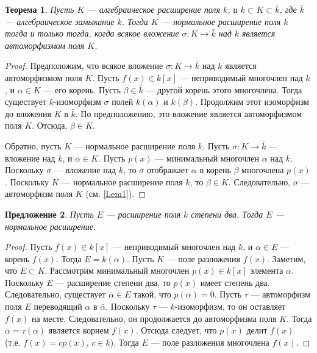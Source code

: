 \documentclass[12pt, titlepage, oneside]{amsbook}
\newtheorem{theorem}{Теорема}[chapter]
\newtheorem{proposition}[theorem]{Предложение}
\theoremstyle{definition}
\theoremstyle{remark}
\begin{document}
\begin{theorem}
\label{Nor6}
Пусть $K$ --- алгебраическое расширение поля $k$, и $k\subset K\subset\bar{k}$, где $\bar{k}$ --- алгебраическое замыкание $k$. Тогда $K$ --- нормальное расширение поля $k$ тогда и только тогда, когда всякое вложение $\sigma\colon K\rightarrow\bar{k}$ над $k$ является автоморфизмом поля $K$.
\end{theorem}

\begin{proof}
Предположим, что всякое вложение $\sigma\colon K\rightarrow\bar{k}$ над $k$ является автоморфизмом поля $K$.
Пусть $f(x)\in k[x]$ --- неприводимый многочлен над $k$, и $\alpha\in K$ --- его корень. Пусть $\beta\in \bar{k}$ --- другой корень этого многочлена. Тогда существует $k$-изоморфизм $\sigma$ полей $k(\alpha)$ и $k(\beta)$. Продолжим этот изоморфизм до вложения $K$ в $\bar{k}$. По предположению, это вложение является автоморфизмом поля $K$. Отсюда, $\beta\in K$.

Обратно, пусть $K$ --- нормальное расширение поля $k$. Пусть $\sigma\colon K\rightarrow\bar{k}$ --- вложение над $k$, и $\alpha\in K$. Пусть $p(x)$ --- минимальный многочлен $\alpha$ над $k$. Поскольку $\sigma$ --- вложение над $k$, то $\sigma$ отображает $\alpha$ в корень $\beta$ многочлена $p(x)$. Поскольку $K$ --- нормальное расширение поля $k$, то $\beta\in K$. Следовательно, $\sigma$ --- автоморфизм поля $K$ (см. \ref{Lem1}).
\end{proof}

\begin{proposition}
\label{Nor7}
Пусть $E$ --- расширение поля $k$ степени два. Тогда $E$ --- нормальное расширение.
\end{proposition}

\begin{proof}
Пусть $f(x)\in k[x]$ --- неприводимый многочлен над $k$, и $\alpha\in E$ --- корень $f(x)$. Тогда $E=k(\alpha)$. Пусть $K$ --- поле разложения $f(x)$. Заметим, что $E\subset K$. Рассмотрим минимальный многочлен $p(x)\in k[x]$ элемента $\alpha$. Поскольку $E$ --- расширение степени два, то $p(x)$ имеет степень два. Следовательно, существует $\bar{\alpha}\in E$ такой, что $p(\bar{\alpha})=0$. Пусть $\tau$ --- автоморфизм поля $E$ переводящий $\alpha$ в $\bar{\alpha}$. Поскольку $\tau$ --- $k$-изоморфизм, то он оставляет $f(x)$ на месте. Следовательно, он продолжается до автоморфизма поля $K$. Тогда $\bar{\alpha}=\tau(\alpha)$ является корнем $f(x)$. Отсюда следует, что $p(x)$ делит $f(x)$ (т.е. $f(x)=cp(x)$, $c\in k$). Тогда $E$ --- поле разложения многочлена $f(x)$.
\end{proof}
\end{document}
